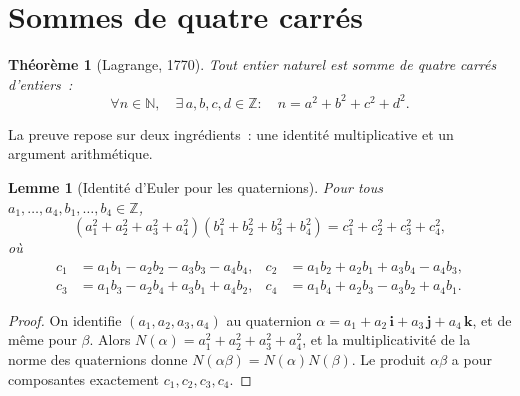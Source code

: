 \documentclass[12pt,a4paper,openany]{book}
\theoremstyle{definition}
\theoremstyle{plain}
\newtheorem{theoreme}[definition]{Théorème}
\newtheorem{lemme}[definition]{Lemme}
\theoremstyle{remark}
\newcommand{\N}{\mathbb{N}}
\newcommand{\Z}{\mathbb{Z}}
\begin{document}
\section{Sommes de quatre carrés}
\label{sec:sommes-quatre-carres}

\begin{theoreme}[Lagrange, 1770]
\label{thm:lagrange-quatre-carres}
Tout entier naturel est somme de quatre carrés d'entiers~:
\[
  \forall n \in \N, \quad \exists\, a,b,c,d \in \Z : \quad
    n = a^2 + b^2 + c^2 + d^2.
\]
\end{theoreme}

La preuve repose sur deux ingrédients~: une identité multiplicative et un argument
arithmétique.

\begin{lemme}[Identité d'Euler pour les quaternions]
\label{lem:identite-euler-quaternions}
Pour tous $a_1, \ldots, a_4, b_1, \ldots, b_4 \in \Z$,
\[
  (a_1^2 + a_2^2 + a_3^2 + a_4^2)(b_1^2 + b_2^2 + b_3^2 + b_4^2)
    = c_1^2 + c_2^2 + c_3^2 + c_4^2,
\]
où \vspace{-2mm}
\begin{align*}
  c_1 &= a_1 b_1 - a_2 b_2 - a_3 b_3 - a_4 b_4, &
  c_2 &= a_1 b_2 + a_2 b_1 + a_3 b_4 - a_4 b_3, \\
  c_3 &= a_1 b_3 - a_2 b_4 + a_3 b_1 + a_4 b_2, &
  c_4 &= a_1 b_4 + a_2 b_3 - a_3 b_2 + a_4 b_1.
\end{align*}
\end{lemme}

\begin{proof}
On identifie $(a_1, a_2, a_3, a_4)$ au quaternion
$\alpha = a_1 + a_2\,\mathbf{i} + a_3\,\mathbf{j} + a_4\,\mathbf{k}$, et de même pour
$\beta$. Alors $N(\alpha) = a_1^2 + a_2^2 + a_3^2 + a_4^2$, et la multiplicativité
de la norme des quaternions donne $N(\alpha\beta) = N(\alpha)N(\beta)$. Le produit
$\alpha\beta$ a pour composantes exactement $c_1, c_2, c_3, c_4$.
\end{proof}
\end{document}
